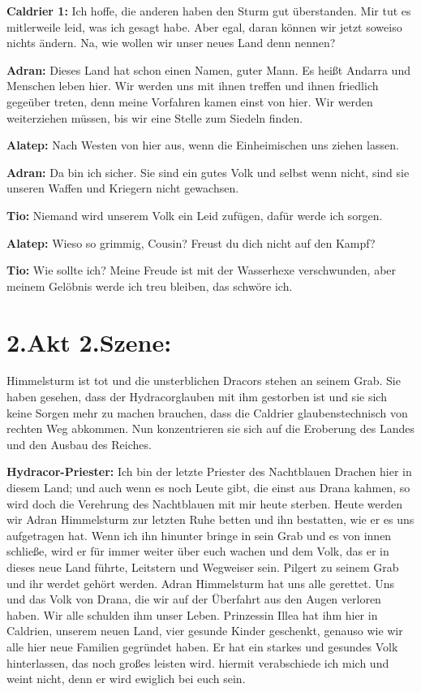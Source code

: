 \documentclass[a5paper,6pt]{book}
\begin{document}
\textbf{Caldrier 1:} Ich hoffe, die anderen haben den Sturm gut überstanden. Mir tut es mitlerweile
leid, was ich gesagt habe. Aber egal, daran können wir jetzt soweiso nichts ändern.
Na, wie wollen wir unser neues Land denn nennen?

\textbf{Adran:} Dieses Land hat schon einen Namen, guter Mann. Es heißt Andarra und Menschen
leben hier. Wir werden uns mit ihnen treffen und ihnen friedlich gegeüber treten, denn
meine Vorfahren kamen einst von hier. Wir werden weiterziehen müssen, bis wir eine
Stelle zum Siedeln finden.

\textbf{Alatep:} Nach Westen von hier aus, wenn die Einheimischen uns ziehen lassen.

\textbf{Adran:} Da bin ich sicher. Sie sind ein gutes Volk und selbst wenn nicht, sind sie unseren
Waffen und Kriegern nicht gewachsen.

\textbf{Tio:} Niemand wird unserem Volk ein Leid zufügen, dafür werde ich sorgen.

\textbf{Alatep:} Wieso so grimmig, Cousin? Freust du dich nicht auf den Kampf?

\textbf{Tio:} Wie sollte ich? Meine Freude ist mit der Wasserhexe verschwunden, aber meinem
Gelöbnis werde ich treu bleiben, das schwöre ich.

\section{2.Akt 2.Szene:}

Himmelsturm ist tot und die unsterblichen Dracors stehen an seinem Grab. Sie haben
gesehen, dass der Hydracorglauben mit ihm gestorben ist und sie sich keine Sorgen mehr zu
machen brauchen, dass die Caldrier glaubenstechnisch von rechten Weg abkommen. Nun
konzentrieren sie sich auf die Eroberung des Landes und den Ausbau des Reiches.

\textbf{Hydracor-Priester:} Ich bin der letzte Priester des Nachtblauen Drachen hier in diesem Land;
und auch wenn es noch Leute gibt, die einst aus Drana kahmen, so wird doch die Verehrung
des Nachtblauen mit mir heute sterben. Heute werden wir Adran Himmelsturm zur letzten
Ruhe betten und ihn bestatten, wie er es uns aufgetragen hat. Wenn ich ihn hinunter bringe
in sein Grab und es von innen schließe, wird er für immer weiter über euch wachen und dem
Volk, das er in dieses neue Land führte, Leitstern und Wegweiser sein. Pilgert zu seinem Grab
und ihr werdet gehört werden. Adran Himmelsturm hat uns alle gerettet. Uns und das Volk
von Drana, die wir auf der Überfahrt aus den Augen verloren haben. Wir alle schulden ihm
unser Leben. Prinzessin Illea hat ihm hier in Caldrien, unserem neuen Land, vier gesunde
Kinder geschenkt, genauso wie wir alle hier neue Familien gegründet haben. Er hat ein
starkes und gesundes Volk hinterlassen, das noch großes leisten wird. hiermit verabschiede
ich mich und weint nicht, denn er wird ewiglich bei euch sein.
\end{document}
